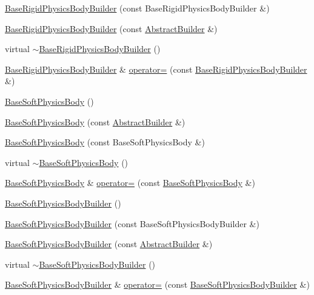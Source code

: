\begin{DoxyCompactItemize}
\hyperlink{namespacejli_a9d0fc4e31b13024aaba83ef9f40cd75d}{Base\+Rigid\+Physics\+Body\+Builder} (const Base\+Rigid\+Physics\+Body\+Builder \&)
\item 
\hyperlink{namespacejli_a33f960117cd9048adfccf6245c42ae26}{Base\+Rigid\+Physics\+Body\+Builder} (const \hyperlink{classjli_1_1_abstract_builder}{Abstract\+Builder} \&)
\item 
virtual \hyperlink{namespacejli_aa360c529f2548e88d8d5eec1d6db6616}{$\sim$\+Base\+Rigid\+Physics\+Body\+Builder} ()
\item 
\hyperlink{namespacejli_a4cdb474048fb5433420b96f927f9b817}{Base\+Rigid\+Physics\+Body\+Builder} \& \hyperlink{namespacejli_aee6a533641209a3c27bea0b636e4ab99}{operator=} (const \hyperlink{namespacejli_a4cdb474048fb5433420b96f927f9b817}{Base\+Rigid\+Physics\+Body\+Builder} \&)
\item 
\hyperlink{namespacejli_a3d48c62c93d7ecba8820d383c7cba343}{Base\+Soft\+Physics\+Body} ()
\item 
\hyperlink{namespacejli_a7f4a9767fe65c22c074c745dcc46151c}{Base\+Soft\+Physics\+Body} (const \hyperlink{classjli_1_1_abstract_builder}{Abstract\+Builder} \&)
\item 
\hyperlink{namespacejli_a7cf91482407d32cbaf787910189561a5}{Base\+Soft\+Physics\+Body} (const Base\+Soft\+Physics\+Body \&)
\item 
virtual \hyperlink{namespacejli_a6111032c62909d367a361b2b6b75d5ef}{$\sim$\+Base\+Soft\+Physics\+Body} ()
\item 
\hyperlink{namespacejli_a3d48c62c93d7ecba8820d383c7cba343}{Base\+Soft\+Physics\+Body} \& \hyperlink{namespacejli_a523e9bc6d65436e210ed19241efba3ed}{operator=} (const \hyperlink{namespacejli_a3d48c62c93d7ecba8820d383c7cba343}{Base\+Soft\+Physics\+Body} \&)
\item 
\hyperlink{namespacejli_a1fb70667531e9332328b61412d87922e}{Base\+Soft\+Physics\+Body\+Builder} ()
\item 
\hyperlink{namespacejli_ae5adda75064876641e3883645ef02c6e}{Base\+Soft\+Physics\+Body\+Builder} (const Base\+Soft\+Physics\+Body\+Builder \&)
\item 
\hyperlink{namespacejli_ab6e0fdaf5bc7026f1fe3f27d94191077}{Base\+Soft\+Physics\+Body\+Builder} (const \hyperlink{classjli_1_1_abstract_builder}{Abstract\+Builder} \&)
\item 
virtual \hyperlink{namespacejli_ac83094dcec9a714f2e82ea1001bbdea3}{$\sim$\+Base\+Soft\+Physics\+Body\+Builder} ()
\item 
\hyperlink{namespacejli_a1fb70667531e9332328b61412d87922e}{Base\+Soft\+Physics\+Body\+Builder} \& \hyperlink{namespacejli_ade54634c2d0015f83656062ee83950e5}{operator=} (const \hyperlink{namespacejli_a1fb70667531e9332328b61412d87922e}{Base\+Soft\+Physics\+Body\+Builder} \&)

\end{DoxyCompactItemize}
